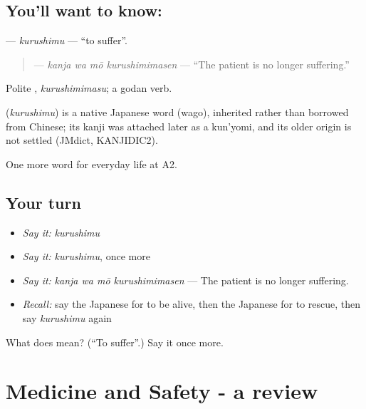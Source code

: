 \subsection*{You'll want to know: }
\textbf{} — \emph{kurushimu} — \textquotedblleft{}to suffer\textquotedblright{}.

\begin{quote}
\textbf{  } — \emph{kanja wa mō kurushimimasen} — \textquotedblleft{}The patient is no longer suffering.\textquotedblright{}
\end{quote}

Polite \textbf{}, \emph{kurushimimasu}; a godan verb.

\begin{cousinweb}
\textbf{} (\emph{kurushimu}) is a native Japanese word (wago), inherited rather than borrowed from Chinese; its kanji was attached later as a kun'yomi, and its older origin is not settled (JMdict, KANJIDIC2).
\end{cousinweb}

\begin{grammarlens}[title={What you've built}]
One more word for everyday life at A2.
\end{grammarlens}

\subsection*{Your turn}
\begin{itemize}
\raggedright
  \item \emph{Say it:} \emph{kurushimu}
  \item \emph{Say it:} \emph{kurushimu}, once more
  \item \emph{Say it:} \emph{kanja wa mō kurushimimasen} — The patient is no longer suffering.
  \item \emph{Recall:} say the Japanese for to be alive, then the Japanese for to rescue, then say \emph{kurushimu} again
\end{itemize}

\begin{tcolorbox}[breakable,colback=teal!4,colframe=teal!35!black,title={Before you move on}]
What does  mean? (\textquotedblleft{}To suffer\textquotedblright{}.) Say it once more.
\end{tcolorbox}
\section[(dialogue)]{Medicine and Safety - a review}

